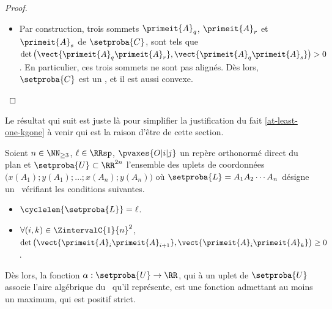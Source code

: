 \begin{proof}
\begin{itemize}
        \item Par construction, trois sommets  $\primeit{A}_q$, $\primeit{A}_r$ et $\primeit{A}_s$ de $\setproba{C}$, sont tels que $\det \big( \vect{\primeit{A}_q \primeit{A}_{r}}, \vect{\primeit{A}_q \primeit{A}_s} \big) > 0$. 
        En particulier, ces trois sommets  ne sont pas alignés.
        Dès lors, $\setproba{C}$ est un \kgone, et il est aussi convexe. 
    \end{itemize}

	\null\vspace{-6ex}
\end{proof}




%

Le résultat qui suit est juste là pour simplifier la justification du fait \ref{at-least-one-kgone} à venir qui est la raison d'être de cette section.


\begin{fact} \label{at-least-one-ncycle}
    Soient $n \in \NN_{\geq3}$,
    $\ell \in \RRsp$,
    $\pvaxes{O | i | j}$ un repère orthonormé direct du plan
    et
    $\setproba{U} \subset \RR^{2n}$ l'ensemble des uplets de coordonnées $\big( x(A_1) ; y(A_1) ; \dots ; x(A_n) ; y(A_n) \big)$ où $\setproba{L} = A_1 A_2 \cdots A_n$ désigne un \ncycle\ vérifiant les conditions suivantes.
    \begin{itemize}
        \item $\cyclelen{\setproba{L}} = \ell$.
    
        \item $\forall (i, k) \in \ZintervalC{1}{n}^2$,
		$\det \big( \vect{\primeit{A}_i \primeit{A}_{i+1}}, \vect{\primeit{A}_i \primeit{A}_k} \big) \geq 0$.
    \end{itemize}
    
    Dès lors, la fonction $\alpha: \setproba{U} \rightarrow \RR$, qui à un uplet de $\setproba{U}$ associe l'aire algébrique du \ncycle\ qu'il représente, est une fonction admettant au moins un maximum, qui est positif strict.
\end{fact}


